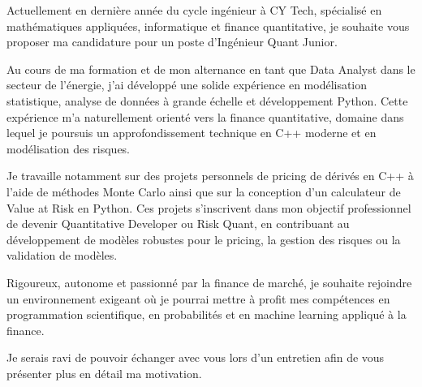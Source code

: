 Actuellement en dernière année du cycle ingénieur à CY Tech, spécialisé en mathématiques appliquées, informatique et finance quantitative, je souhaite vous proposer ma candidature pour un poste d'Ingénieur Quant Junior.

Au cours de ma formation et de mon alternance en tant que Data Analyst dans le secteur de l'énergie, j'ai développé une solide expérience en modélisation statistique, analyse de données à grande échelle et développement Python. Cette expérience m'a naturellement orienté vers la finance quantitative, domaine dans lequel je poursuis un approfondissement technique en C++ moderne et en modélisation des risques.

Je travaille notamment sur des projets personnels de pricing de dérivés en C++ à l'aide de méthodes Monte Carlo ainsi que sur la conception d'un calculateur de Value at Risk en Python. Ces projets s'inscrivent dans mon objectif professionnel de devenir Quantitative Developer ou Risk Quant, en contribuant au développement de modèles robustes pour le pricing, la gestion des risques ou la validation de modèles.

Rigoureux, autonome et passionné par la finance de marché, je souhaite rejoindre un environnement exigeant où je pourrai mettre à profit mes compétences en programmation scientifique, en probabilités et en machine learning appliqué à la finance.

Je serais ravi de pouvoir échanger avec vous lors d'un entretien afin de vous présenter plus en détail ma motivation.

